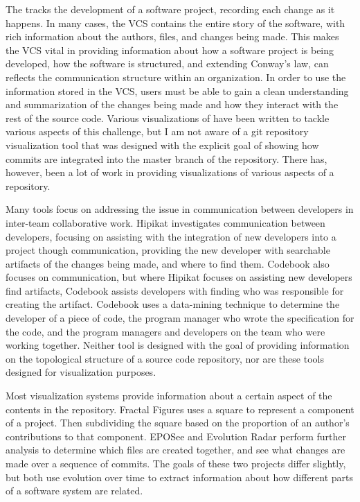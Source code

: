 The  tracks the development of a
software project, recording each change as it happens. In many cases,
the VCS contains the entire story of the software, with rich information
about the authors, files, and changes being made. This makes the VCS
vital in providing information about how a software project is being
developed, how the software is structured, and extending Conway's law,
can reflects the communication structure within an organization. In
order to use the information stored in the VCS, users must be able to
gain a clean understanding and summarization of the changes being made
and how they interact with the rest of the source code. Various
visualizations of have been written to tackle various aspects of this
challenge, but I am not aware of a git repository visualization tool
that was designed with the explicit goal of showing how commits are
integrated into the master branch of the repository. There has, however,
been a lot of work in providing visualizations of various aspects of a
repository.

Many tools focus on addressing the issue in communication between
developers in inter-team collaborative work. Hipikat\cite{Cubranic2005}
investigates communication between developers, focusing on assisting
with the integration of new developers into a project though
communication, providing the new developer with searchable artifacts of
the changes being made, and where to find them. Codebook\cite{Begel2010}
also focuses on communication, but where Hipikat focuses on assisting
new developers find artifacts, Codebook assists developers with finding
who was responsible for creating the artifact. Codebook uses a
data-mining technique to determine the developer of a piece of code, the
program manager who wrote the specification for the code, and the
program managers and developers on the team who were working together.
Neither tool is designed with the goal of providing information on the
topological structure of a source code repository, nor are these tools
designed for visualization purposes.

Most visualization systems provide information about a certain aspect of
the contents in the repository. Fractal Figures\cite{Ambros2005} uses a
square to represent a component of a project. Then subdividing the
square based on the proportion of an author's contributions to that
component. EPOSee\cite{Burch2005} and Evolution Radar\cite{Ambros2009}
perform further analysis to determine which files are created together,
and see what changes are made over a sequence of commits. The goals of
these two projects differ slightly, but both use evolution over time to
extract information about how different parts of a software system are
related.

